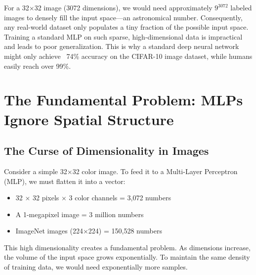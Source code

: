 \documentclass{article}
\begin{document}
For a 32×32 image (3072 dimensions), we would need approximately $9^{3072}$ labeled images to densely fill the input space—an astronomical number. Consequently, any real-world dataset only populates a tiny fraction of the possible input space. Training a standard MLP on such sparse, high-dimensional data is impractical and leads to poor generalization. This is why a standard deep neural network might only achieve ~74\% accuracy on the CIFAR-10 image dataset, while humans easily reach over 99\%.



\section{The Fundamental Problem: MLPs Ignore Spatial Structure}

\subsection{The Curse of Dimensionality in Images}

Consider a simple 32×32 color image. To feed it to a Multi-Layer Perceptron (MLP), we must flatten it into a vector:
\begin{itemize}
    \item 32 × 32 pixels × 3 color channels = 3,072 numbers
    \item A 1-megapixel image = 3 million numbers
    \item ImageNet images (224×224) = 150,528 numbers
\end{itemize}

This high dimensionality creates a fundamental problem. As dimensions increase, the volume of the input space grows exponentially. To maintain the same density of training data, we would need exponentially more samples.
\end{document}
